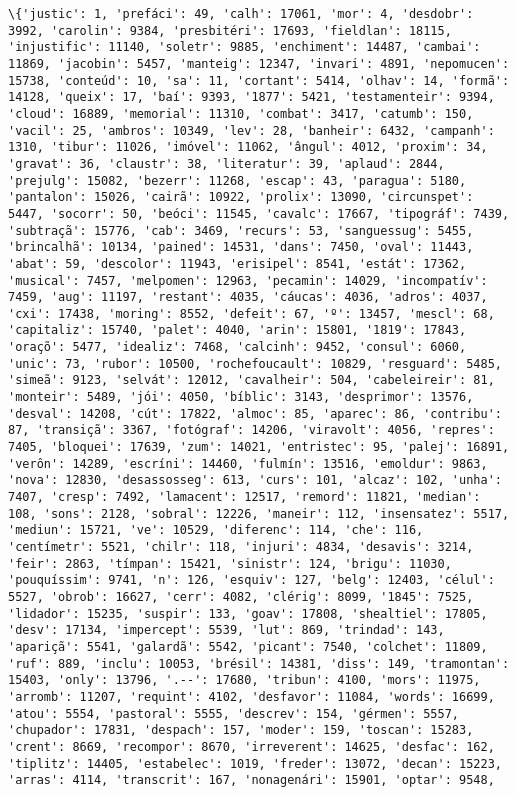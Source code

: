     \begin{Verbatim}[commandchars=\\\{\}]
\{'justic': 1, 'prefáci': 49, 'calh': 17061, 'mor': 4, 'desdobr': 3992, 'carolin': 9384, 'presbitéri': 17693, 'fieldlan': 18115, 'injustific': 11140, 'soletr': 9885, 'enchiment': 14487, 'cambai': 11869, 'jacobin': 5457, 'manteig': 12347, 'invari': 4891, 'nepomucen': 15738, 'conteúd': 10, 'sa': 11, 'cortant': 5414, 'olhav': 14, 'formã': 14128, 'queix': 17, 'baí': 9393, '1877': 5421, 'testamenteir': 9394, 'cloud': 16889, 'memorial': 11310, 'combat': 3417, 'catumb': 150, 'vacil': 25, 'ambros': 10349, 'lev': 28, 'banheir': 6432, 'campanh': 1310, 'tibur': 11026, 'imóvel': 11062, 'ângul': 4012, 'proxim': 34, 'gravat': 36, 'claustr': 38, 'literatur': 39, 'aplaud': 2844, 'prejulg': 15082, 'bezerr': 11268, 'escap': 43, 'paragua': 5180, 'pantalon': 15026, 'cairã': 10922, 'prolix': 13090, 'circunspet': 5447, 'socorr': 50, 'beóci': 11545, 'cavalc': 17667, 'tipográf': 7439, 'subtraçã': 15776, 'cab': 3469, 'recurs': 53, 'sanguessug': 5455, 'brincalhã': 10134, 'pained': 14531, 'dans': 7450, 'oval': 11443, 'abat': 59, 'descolor': 11943, 'erisipel': 8541, 'estát': 17362, 'musical': 7457, 'melpomen': 12963, 'pecamin': 14029, 'incompatív': 7459, 'aug': 11197, 'restant': 4035, 'cáucas': 4036, 'adros': 4037, 'cxi': 17438, 'moring': 8552, 'defeit': 67, 'º': 13457, 'mescl': 68, 'capitaliz': 15740, 'palet': 4040, 'arin': 15801, '1819': 17843, 'oraçõ': 5477, 'idealiz': 7468, 'calcinh': 9452, 'consul': 6060, 'unic': 73, 'rubor': 10500, 'rochefoucault': 10829, 'resguard': 5485, 'simeã': 9123, 'selvát': 12012, 'cavalheir': 504, 'cabeleireir': 81, 'monteir': 5489, 'jói': 4050, 'bíblic': 3143, 'desprimor': 13576, 'desval': 14208, 'cút': 17822, 'almoc': 85, 'aparec': 86, 'contribu': 87, 'transiçã': 3367, 'fotógraf': 14206, 'viravolt': 4056, 'repres': 7405, 'bloquei': 17639, 'zum': 14021, 'entristec': 95, 'palej': 16891, 'verôn': 14289, 'escríni': 14460, 'fulmín': 13516, 'emoldur': 9863, 'nova': 12830, 'desassosseg': 613, 'curs': 101, 'alcaz': 102, 'unha': 7407, 'cresp': 7492, 'lamacent': 12517, 'remord': 11821, 'median': 108, 'sons': 2128, 'sobral': 12226, 'maneir': 112, 'insensatez': 5517, 'mediun': 15721, 've': 10529, 'diferenc': 114, 'che': 116, 'centímetr': 5521, 'chilr': 118, 'injuri': 4834, 'desavis': 3214, 'feir': 2863, 'tímpan': 15421, 'sinistr': 124, 'brigu': 11030, 'pouquíssim': 9741, 'n': 126, 'esquiv': 127, 'belg': 12403, 'célul': 5527, 'obrob': 16627, 'cerr': 4082, 'clérig': 8099, '1845': 7525, 'lidador': 15235, 'suspir': 133, 'goav': 17808, 'shealtiel': 17805, 'desv': 17134, 'impercept': 5539, 'lut': 869, 'trindad': 143, 'apariçã': 5541, 'galardã': 5542, 'picant': 7540, 'colchet': 11809, 'ruf': 889, 'inclu': 10053, 'brésil': 14381, 'diss': 149, 'tramontan': 15403, 'only': 13796, '.--': 17680, 'tribun': 4100, 'mors': 11975, 'arromb': 11207, 'requint': 4102, 'desfavor': 11084, 'words': 16699, 'atou': 5554, 'pastoral': 5555, 'descrev': 154, 'gérmen': 5557, 'chupador': 17831, 'despach': 157, 'moder': 159, 'toscan': 15283, 'crent': 8669, 'recompor': 8670, 'irreverent': 14625, 'desfac': 162, 'tiplitz': 14405, 'estabelec': 1019, 'freder': 13072, 'decan': 15223, 'arras': 4114, 'transcrit': 167, 'nonagenári': 15901, 'optar': 9548, 
\end{Verbatim}
